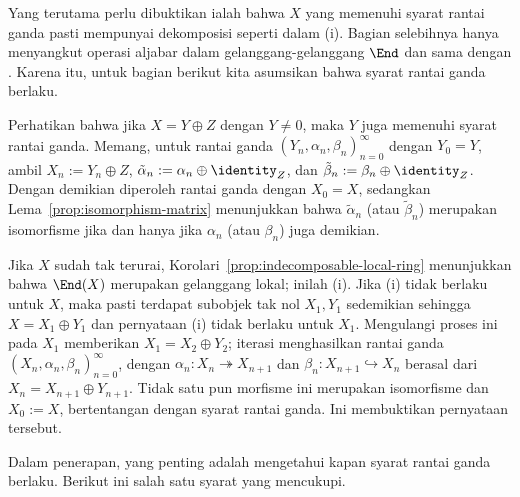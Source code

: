 \begin{bukti}
	Yang terutama perlu dibuktikan ialah bahwa $X$ yang memenuhi syarat rantai
	ganda pasti mempunyai dekomposisi seperti dalam (i). Bagian selebihnya hanya
	menyangkut operasi aljabar dalam gelanggang-gelanggang $\End$ dan sama dengan
	\cite[Teorema 6.12.8]{Li1}. Karena itu, untuk bagian berikut kita asumsikan
	bahwa syarat rantai ganda berlaku.

	Perhatikan bahwa jika $X=Y\oplus Z$ dengan $Y\neq 0$, maka $Y$ juga
	memenuhi syarat rantai ganda. Memang, untuk rantai ganda
	$(Y_n,\alpha_n,\beta_n)_{n=0}^\infty$ dengan $Y_0=Y$, ambil
	$X_n:=Y_n\oplus Z$, $\tilde{\alpha}_n:=\alpha_n\oplus\identity_Z$, dan
	$\tilde{\beta}_n:=\beta_n\oplus\identity_Z$. Dengan demikian diperoleh
	rantai ganda dengan $X_0=X$, sedangkan
	Lema~\ref{prop:isomorphism-matrix} menunjukkan bahwa
	$\tilde{\alpha}_n$ (atau $\tilde{\beta}_n$) merupakan isomorfisme jika dan
	hanya jika $\alpha_n$ (atau $\beta_n$) juga demikian.

	Jika $X$ sudah tak terurai, Korolari~\ref{prop:indecomposable-local-ring}
	menunjukkan bahwa $\End(X)$ merupakan gelanggang lokal; inilah (i). Jika
	(i) tidak berlaku untuk $X$, maka pasti terdapat subobjek tak nol
	$X_1,Y_1$ sedemikian sehingga $X=X_1\oplus Y_1$ dan pernyataan (i) tidak
	berlaku untuk $X_1$. Mengulangi proses ini pada $X_1$ memberikan
	$X_1=X_2\oplus Y_2$; iterasi menghasilkan rantai ganda
	$(X_n,\alpha_n,\beta_n)_{n=0}^\infty$, dengan
	$\alpha_n:X_n\twoheadrightarrow X_{n+1}$ dan
	$\beta_n:X_{n+1}\hookrightarrow X_n$ berasal dari
	$X_n=X_{n+1}\oplus Y_{n+1}$. Tidak satu pun morfisme ini merupakan
	isomorfisme dan $X_0:=X$, bertentangan dengan syarat rantai ganda. Ini
	membuktikan pernyataan tersebut.
\end{bukti}

Dalam penerapan, yang penting adalah mengetahui kapan syarat rantai ganda
berlaku. Berikut ini salah satu syarat yang mencukupi.

